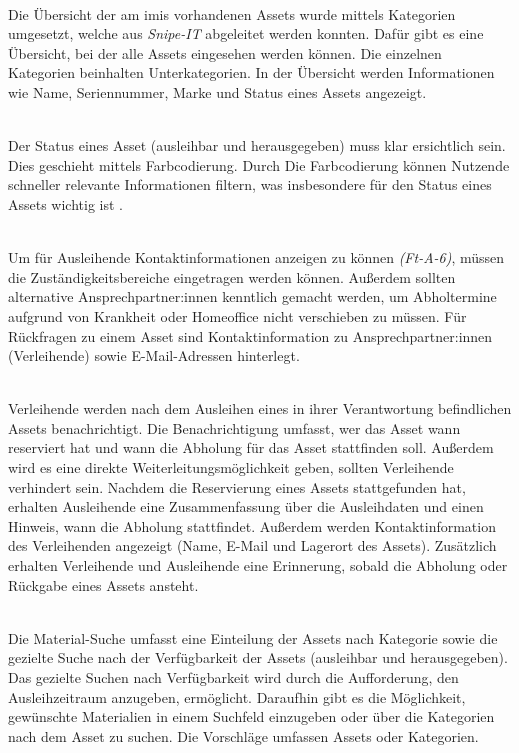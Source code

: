     {\sffamily\color{maincolor}{Ft-VA-2 | Übersicht über ausleihbare Assets }}\\
Die Übersicht der am \ac{imis} vorhandenen Assets wurde mittels Kategorien
umgesetzt, welche aus \textit{Snipe-IT} abgeleitet werden konnten. Dafür gibt es
eine Übersicht, bei der alle Assets eingesehen werden können. Die einzelnen
Kategorien beinhalten Unterkategorien. In der Übersicht werden Informationen wie
Name, Seriennummer, Marke und Status eines Assets angezeigt.

    {\sffamily\color{maincolor}{Ft-VA-3 |  Verfügbarkeit von Assets }}\\
Der Status eines Asset (ausleihbar und herausgegeben) muss klar ersichtlich sein. Dies geschieht
mittels Farbcodierung. Durch Die Farbcodierung können Nutzende schneller relevante Informationen
filtern, was insbesondere für den Status eines Assets wichtig ist \cite{google_material_2022}.


{\sffamily\color{maincolor}{Ft-VA-4 | Zuständigkeitsbereich }}\\
Um für Ausleihende Kontaktinformationen anzeigen zu können \textit{(Ft-A-6)},
müssen die Zuständigkeitsbereiche eingetragen werden können. Außerdem sollten
alternative Ansprechpartner:innen kenntlich gemacht werden, um Abholtermine
aufgrund von Krankheit oder Homeoffice nicht verschieben zu müssen. Für
Rückfragen zu einem Asset sind Kontaktinformation zu Ansprechpartner:innen
(Verleihende) sowie E-Mail-Adressen hinterlegt.

    {\sffamily\color{maincolor}{Ft-VA-5 | Benachrichtigungen \& Erinnerungen
        }}\\
Verleihende werden nach dem Ausleihen eines in ihrer Verantwortung befindlichen Assets
benachrichtigt. Die Benachrichtigung umfasst, wer das Asset wann reserviert hat und wann die
Abholung für das Asset stattfinden soll. Außerdem wird es eine direkte Weiterleitungsmöglichkeit
geben, sollten Verleihende verhindert sein. Nachdem die Reservierung eines Assets stattgefunden hat,
erhalten Ausleihende eine Zusammenfassung über die Ausleihdaten und einen Hinweis, wann die Abholung
stattfindet. Außerdem werden Kontaktinformation des Verleihenden angezeigt (Name, E-Mail und
Lagerort des Assets). Zusätzlich erhalten Verleihende und Ausleihende eine Erinnerung, sobald die
Abholung oder Rückgabe eines Assets ansteht.

    {\sffamily\color{maincolor}{Ft-VA-6 | Material-Suche }}\\
Die Material-Suche umfasst eine Einteilung der Assets nach Kategorie sowie die gezielte Suche nach
der Verfügbarkeit der Assets (ausleihbar und herausgegeben). Das gezielte Suchen nach Verfügbarkeit
wird durch die Aufforderung, den Ausleihzeitraum anzugeben, ermöglicht. Daraufhin gibt es die
Möglichkeit, gewünschte Materialien in einem Suchfeld einzugeben oder über die Kategorien nach dem
Asset zu suchen. Die Vorschläge umfassen Assets oder Kategorien.

